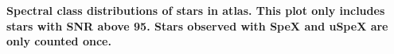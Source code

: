 {\bf  Spectral class distributions of stars in atlas. This plot only includes stars with SNR above 95.  Stars observed with SpeX and uSpeX are only counted once.\label{fig:hiso-spt-type}}
